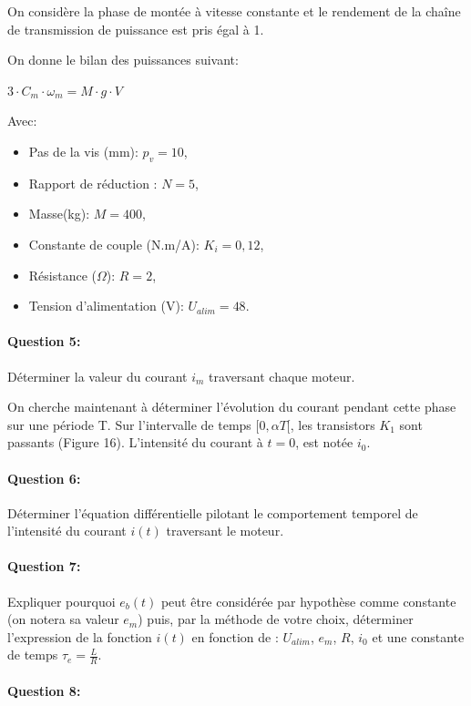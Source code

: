 On considère la phase de montée à vitesse constante et le rendement de la chaîne de transmission de
puissance est pris égal à 1.

On donne le bilan des puissances suivant:

$3\cdot C_m\cdot\omega_m=M\cdot g\cdot V$

Avec:
\begin{itemize}
 \item Pas de la vis (mm): $p_v=10$,
 \item Rapport de réduction : $N=5$,
 \item Masse(kg): $M=400$,
 \item Constante de couple (N.m/A): $K_i=0,12$,
 \item Résistance ($\Omega$): $R=2$,
 \item Tension d'alimentation (V): $U_{alim}=48$.
\end{itemize}

\paragraph{Question 5:}

Déterminer la valeur du courant $i_m$ traversant chaque moteur.

On cherche maintenant à déterminer l'évolution du courant pendant cette phase sur une période T. Sur l'intervalle de temps $[0,\alpha T[$, les transistors $K_1$ sont passants (Figure 16). L'intensité du courant à $t = 0$, est
notée $i_0$.

\paragraph{Question 6:}

Déterminer l'équation différentielle pilotant le comportement temporel de l'intensité du courant $i(t)$ traversant le moteur.

\paragraph{Question 7:}

Expliquer pourquoi $e_b(t)$ peut être considérée par hypothèse comme constante (on notera sa valeur $e_m$) puis, par la méthode de votre choix, déterminer l'expression de la fonction $i(t)$ en fonction de : $U_{alim}$, $e_m$, $R$, $i_0$ et une constante de temps $\tau_e=\frac{L}{R}$.

\paragraph{Question 8:}

